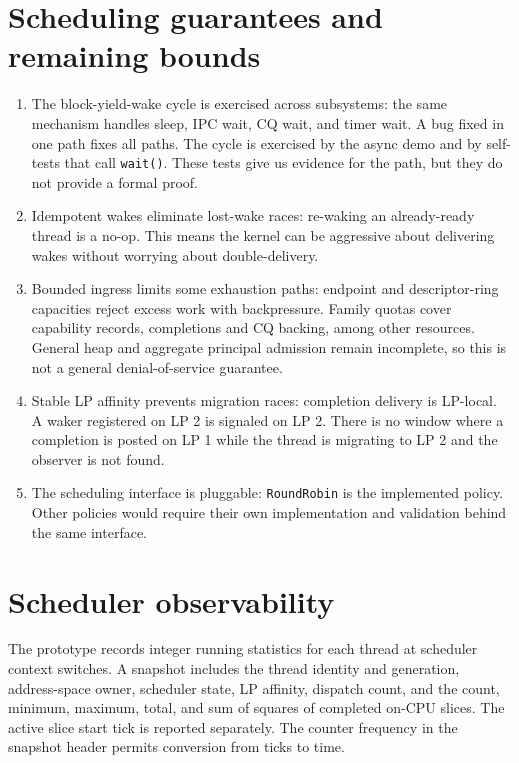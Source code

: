 \section{Scheduling guarantees and remaining bounds}

\begin{enumerate}
    \item The block-yield-wake cycle is exercised across subsystems: the same
        mechanism handles sleep, IPC wait, CQ wait, and timer wait. A bug fixed
        in one path fixes all paths. The cycle is exercised by the async demo and
        by self-tests that call \texttt{wait()}. These tests give us evidence for
        the path, but they do not provide a formal proof.

    \item Idempotent wakes eliminate lost-wake races: re-waking an
        already-ready thread is a no-op. This means the kernel can be aggressive
        about delivering wakes without worrying about double-delivery.

    \item Bounded ingress limits some exhaustion paths: endpoint and
        descriptor-ring capacities reject excess work with backpressure.
        Family quotas cover capability records, completions and CQ backing,
        among other resources. General heap and aggregate principal admission
        remain incomplete, so this is not a general denial-of-service guarantee.

    \item Stable LP affinity prevents migration races: completion
        delivery is LP-local. A waker registered on LP 2 is signaled on LP 2.
        There is no window where a completion is posted on LP 1 while the thread
        is migrating to LP 2 and the observer is not found.

    \item The scheduling interface is pluggable: \texttt{RoundRobin} is
        the implemented policy. Other policies would require their own
        implementation and validation behind the same interface.
\end{enumerate}

\section{Scheduler observability}

The prototype records integer running statistics for each thread at scheduler
context switches. A snapshot includes the thread identity and generation,
address-space owner, scheduler state, LP affinity, dispatch count, and the
count, minimum, maximum, total, and sum of squares of completed on-CPU slices.
The active slice start tick is reported separately. The counter frequency in
the snapshot header permits conversion from ticks to time.

